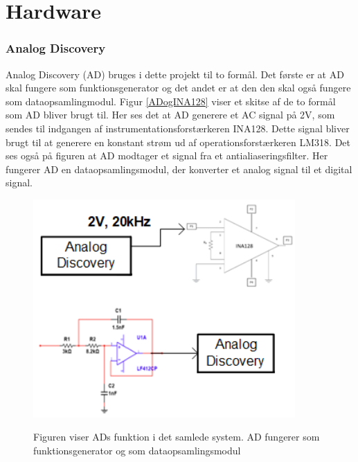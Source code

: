 \chapter{Hardware}

\subsection{Analog Discovery}
Analog Discovery (AD) bruges i dette projekt til to formål. Det første er at AD skal fungere som funktionsgenerator og det andet er at den den skal også fungere som dataopsamlingmodul. Figur \ref{ADogINA128} viser et skitse af de to formål som AD bliver brugt til. Her ses det at AD generere et AC signal på 2V, som sendes til indgangen af instrumentationsforstærkeren INA128. Dette signal bliver brugt til at generere en konstant strøm ud af operationsforstærkeren LM318. Det ses også på figuren at AD modtager et signal fra et antialiaseringsfilter. Her fungerer AD en dataopsamlingsmodul, der konverter et analog signal til et digital signal. 


   
\begin{figure}[H]
\centering
{\includegraphics[width=10cm]
{Figure/ADogINA128}}
\caption{Figuren viser ADs funktion i det samlede system. AD fungerer som funktionsgenerator og som dataopsamlingsmodul}
\label{analogOgINA}
\end{figure}


